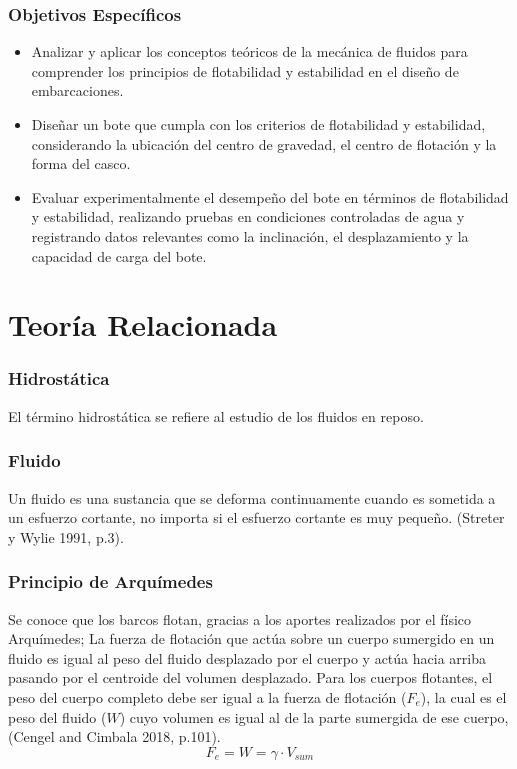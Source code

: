 \documentclass[letterpaper]{article}
\begin{document}
\subsubsection{Objetivos Específicos}
\begin{itemize}
	\item Analizar y aplicar los conceptos teóricos de la mecánica de fluidos para comprender los principios de flotabilidad y estabilidad en el diseño de embarcaciones.
	\item Diseñar un bote que cumpla con los criterios de flotabilidad y estabilidad, considerando la ubicación del centro de gravedad, el centro de flotación y la forma del casco.
	\item Evaluar experimentalmente el desempeño del bote en términos de flotabilidad y estabilidad, realizando pruebas en condiciones controladas de agua y registrando datos relevantes como la inclinación, el desplazamiento y la capacidad de carga del bote.
\end{itemize}
\newpage

\section{Teoría Relacionada}
\subsubsection{Hidrostática}
\setlength{\parindent}{18pt}

El término hidrostática se refiere al estudio de los fluidos en reposo.

\subsubsection{Fluido}
\setlength{\parindent}{18pt}
Un fluido es una sustancia que se deforma continuamente cuando es sometida 
a un esfuerzo cortante, no importa si el esfuerzo cortante es muy pequeño. (Streter y Wylie 1991, p.3). 

\subsubsection{Principio de Arquímedes}
\setlength{\parindent}{18pt}
Se conoce que los barcos flotan, gracias a los aportes realizados por el físico Arquímedes;
La fuerza de flotación que actúa sobre un cuerpo sumergido en un fluido es igual
al peso del fluido desplazado por el cuerpo y actúa hacia arriba pasando por el
centroide del volumen desplazado. Para los cuerpos flotantes, el peso del cuerpo completo debe ser igual a la fuerza
de flotación ($F_{e}$), la cual es el peso del fluido ($W$) cuyo volumen es igual al de la parte sumergida
de ese cuerpo, (Cengel and Cimbala 2018, p.101). 
\begin{equation}
	F_{e}= W = \gamma \cdot  V_{sum} 
\end{equation}
\end{document}
